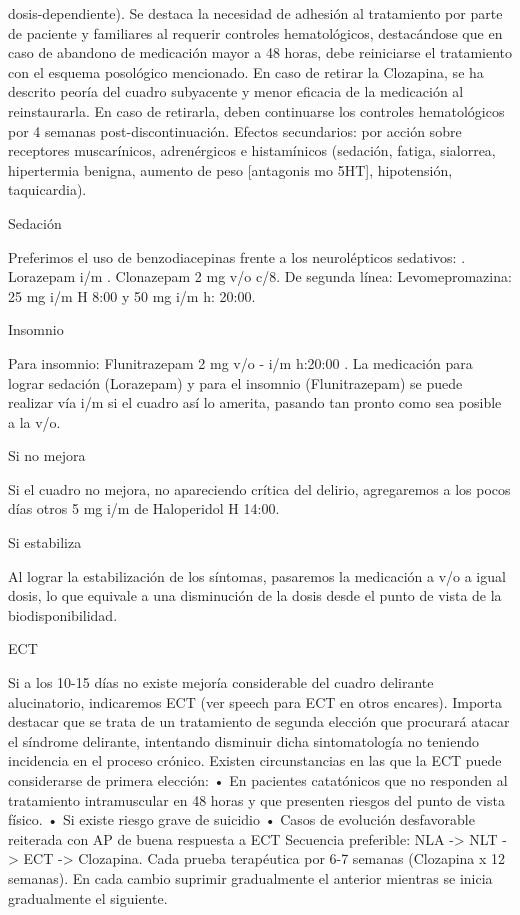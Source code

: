 \documentclass[encares.tex]{subfiles}
\begin{document}
dosis-dependiente). Se destaca la necesidad de adhesión al tratamiento por parte de paciente y familiares al requerir controles hematológicos, destacándose que en caso de abandono de medicación mayor a 48 horas, debe reiniciarse el tratamiento con el esquema posológico mencionado. En caso de retirar la Clozapina, se ha descrito peoría del cuadro subyacente y menor eficacia de la medicación al reinstaurarla. En caso de retirarla, deben continuarse los controles hematológicos por 4 semanas post-discontinuación. Efectos secundarios: por acción sobre receptores muscarínicos, adrenérgicos e histamínicos (sedación, fatiga, sialorrea, hipertermia benigna, aumento de peso [antagonis mo 5HT], hipotensión, taquicardia).

Sedación

Preferimos el uso de benzodiacepinas frente a los neurolépticos sedativos: . Lorazepam i/m . Clonazepam 2 mg v/o c/8. De segunda línea: Levomepromazina: 25 mg i/m H 8:00 y 50 mg i/m h: 20:00.

Insomnio

Para insomnio: Flunitrazepam 2 mg v/o - i/m h:20:00 . La medicación para lograr sedación (Lorazepam) y para el insomnio (Flunitrazepam) se puede realizar vía i/m si el cuadro así lo amerita, pasando tan pronto como sea posible a la v/o.

Si no mejora

Si el cuadro no mejora, no apareciendo crítica del delirio, agregaremos a los pocos días otros 5 mg i/m de Haloperidol H 14:00.

Si estabiliza

Al lograr la estabilización de los síntomas, pasaremos la medicación a v/o a igual dosis, lo que equivale a una disminución de la dosis desde el punto de vista de la biodisponibilidad.

ECT

Si a los 10-15 días no existe mejoría considerable del cuadro delirante alucinatorio, indicaremos ECT (ver speech para ECT en otros encares). Importa destacar que se trata de un tratamiento de segunda elección que procurará atacar el síndrome delirante, intentando disminuir dicha sintomatología no teniendo incidencia en el proceso crónico. Existen circunstancias en las que la ECT puede considerarse de primera elección: • En pacientes catatónicos que no responden al tratamiento intramuscular en 48 horas y que presenten riesgos del punto de vista físico. • Si existe riesgo grave de suicidio • Casos de evolución desfavorable reiterada con AP de buena respuesta a ECT Secuencia preferible: NLA -> NLT -> ECT -> Clozapina. Cada prueba terapéutica por 6-7 semanas (Clozapina x 12 semanas). En cada cambio suprimir gradualmente el anterior mientras se inicia gradualmente el siguiente.
\end{document}
